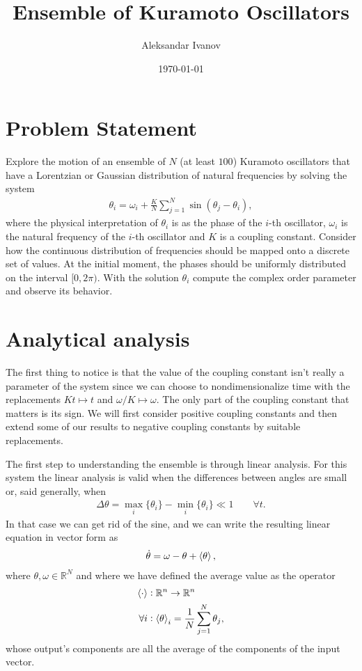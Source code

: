 \documentclass[10pt,a4paper,twocolumn]{article}
\begin{document}
\title{Ensemble of Kuramoto Oscillators}
\author{Aleksandar Ivanov}
\date{\today}
\maketitle

\section{Problem Statement}

Explore the motion of an ensemble of $N$ (at least $100$) Kuramoto oscillators that have a Lorentzian or Gaussian distribution of natural frequencies by solving the system
%
\begin{align}\label{eq:kuramoto}
    \theta_i = \omega_i + \frac{K}{N} \sum_{j=1}^N \sin(\theta_j - \theta_i),
\end{align}
%
where the physical interpretation of $\theta_i$ is as the phase of the $i$-th oscillator, $\omega_i$ is the natural frequency of the $i$-th oscillator and $K$ is a coupling constant. Consider how the continuous distribution of frequencies should be mapped onto a discrete set of values. At the initial moment, the phases should be uniformly distributed on the interval $[0, 2 \pi)$. With the solution $\theta_i$ compute the complex order parameter and observe its behavior.

\section{Analytical analysis}

The first thing to notice is that the value of the coupling constant isn't really a parameter of the system since we can choose to nondimensionalize time with the replacements $Kt \mapsto t$ and $\omega/K \mapsto \omega$. The only part of the coupling constant that matters is its sign. We will first consider positive coupling constants and then extend some of our results to negative coupling constants by suitable replacements.

The first step to understanding the ensemble is through linear analysis. For this system the linear analysis is valid when the differences between angles are small or, said generally, when
%
\begin{align}
    \Delta \theta = \max_i\{\theta_i\} - \min_i\{\theta_i\} \ll 1 \quad \quad \forall t.
\end{align}
In that case we can get rid of the sine, and we can write the resulting linear equation in vector form as
%
\begin{align}
    \dot{\theta} = \omega - \theta + \braket{\theta},
\end{align}
%
where $\theta, \omega \in \mathbb{R}^N$ and where we have defined the average value as the operator
%
\begin{align}
    \braket{\cdot}&: \mathbb{R}^n \rightarrow \mathbb{R}^n \notag\\
    \forall i&: \braket{\theta}_i = \frac{1}{N} \sum_{j=1}^N \theta_j,
\end{align}
%
whose output's components are all the average of the components of the input vector.
\end{document}
